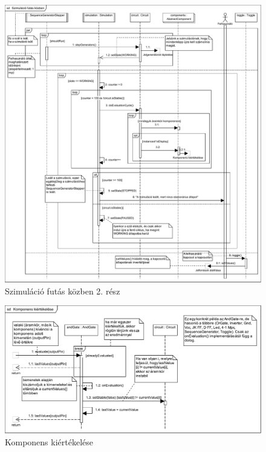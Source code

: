 \begin{figure}[H]
\begin{center}
\includegraphics*[width = 23.5cm, angle = 90, viewport = 0 0 830 500]{chapters/chapter03/seqdiagrams/sim_running.pdf}
\caption{Szimuláció futás közben 2. rész}
\label{fig:sim_running2}
\end{center}
\end{figure}

\begin{figure}[H]
\begin{center}
\includegraphics[angle = 90]{chapters/chapter03/seqdiagrams/sim_evaluate.pdf}
\caption{Komponens kiértékelése}
\label{fig:sim_evaluate}
\end{center}
\end{figure}

